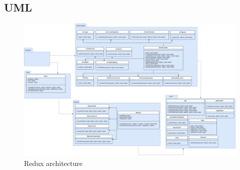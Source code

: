 \begin{landscape}
	\subsection{UML} 
	
	\begin{figure}[H]
		\centering\includegraphics[scale = 0.3]{res/images/ReduxDiagram.png}
		\caption{Redux architecture}
	\end{figure}
\end{landscape}